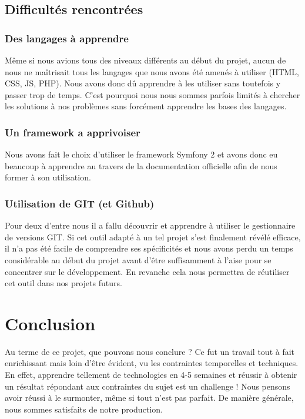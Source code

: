 \documentclass{report}
\begin{document}
  \section{Difficultés rencontrées}
    \subsection{Des langages à apprendre}
        Même si nous avions tous des niveaux différents au début du projet,
    aucun de nous ne maîtrisait tous les langages que nous avons été amenés à
    utiliser (HTML, CSS, JS, PHP). Nous avons donc dû apprendre à les utiliser
    sans toutefois y passer trop de temps. C'est pourquoi nous nous sommes parfois
    limités à chercher les solutions à nos problèmes sans forcément apprendre les
    bases des langages.
    
    \subsection{Un framework a apprivoiser}
        Nous avons fait le choix d'utiliser le framework Symfony 2 et avons
    donc eu beaucoup à apprendre au travers de la documentation officielle afin
    de nous former à son utilisation.
    
    \subsection{Utilisation de GIT (et Github)}
        Pour deux d'entre nous il a fallu découvrir et apprendre à utiliser le
    gestionnaire de versions GIT. Si cet outil adapté à un tel projet s'est
    finalement révélé efficace, il n'a pas été facile de comprendre ses
    spécificités et nous avons perdu un temps considérable au début du projet
    avant d'être suffisamment à l'aise pour se concentrer sur le développement.
    En revanche cela nous permettra de réutiliser cet outil dans nos projets
    futurs.
  
  \chapter*{Conclusion}
        Au terme de ce projet, que pouvons nous conclure ? Ce fut un travail tout
    à fait enrichissant mais loin d'être évident, vu les contraintes temporelles et
    techniques. En effet, apprendre tellement de technologies en 4-5 semaines et
    réussir à obtenir un résultat répondant aux contraintes du sujet est un
    challenge ! Nous pensons avoir réussi à le surmonter, même si tout n'est pas
    parfait. De manière générale, nous sommes satisfaits de notre production.
    
\end{document}
